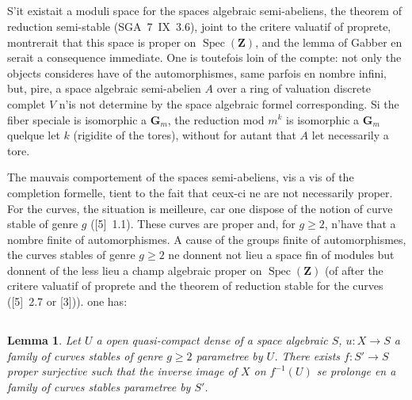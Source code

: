 \documentclass[12pt,a4paper]{article}
\theoremstyle{plain}
\newtheorem{lemma}[theorem]{Lemma}
\theoremstyle{definition}
\theoremstyle{remark}
\DeclareMathOperator{\Spec}{Spec}
\begin{document}
\subsection{} S'it existait a moduli space for the spaces algebraic semi-abeliens, the theorem of reduction semi-stable (SGA~7~IX~3.6), joint to the critere valuatif of proprete, montrerait that this space is proper on $\Spec(\mathbf{Z})$, and the lemma of Gabber en serait a consequence immediate. One is toutefois loin of the compte: not only the objects consideres have of the automorphismes, same parfois en nombre infini, but, pire, a space algebraic semi-abelien $A$ over a ring of valuation discrete complet $V$ n'is not determine by the space algebraic formel corresponding. Si the fiber speciale is isomorphic a $\mathbf{G}_m$, the reduction mod $m^k$ is isomorphic a $\mathbf{G}_m$ quelque let $k$ (rigidite of the tores), without for autant that $A$ let necessarily a tore.

The mauvais comportement of the spaces semi-abeliens, vis a vis of the completion formelle, tient to the fait that ceux-ci ne are not necessarily proper. For the curves, the situation is meilleure, car one dispose of the notion of curve stable of genre $g$ ([5]~1.1). These curves are proper and, for $g \geq 2$, n'have that a nombre finite of automorphismes. A cause of the groups finite of automorphismes, the curves stables of genre $g \geq 2$ ne donnent not lieu a space fin of modules but donnent of the less lieu a champ algebraic proper on $\Spec(\mathbf{Z})$ (of after the critere valuatif of proprete and the theorem of reduction stable for the curves ([5]~2.7 or [3])). one has:

\subsection{}\label{sec:1.6}

\begin{lemma}
Let $U$ a open quasi-compact dense of a space algebraic $S$, $u : X \to S$ a family of curves stables of genre $g \geq 2$ parametree by $U$. There exists $f : S' \to S$ proper surjective such that the inverse image of $X$ on $f^{-1}(U)$ se prolonge en a family of curves stables parametree by $S'$.
\end{lemma}
\end{document}
